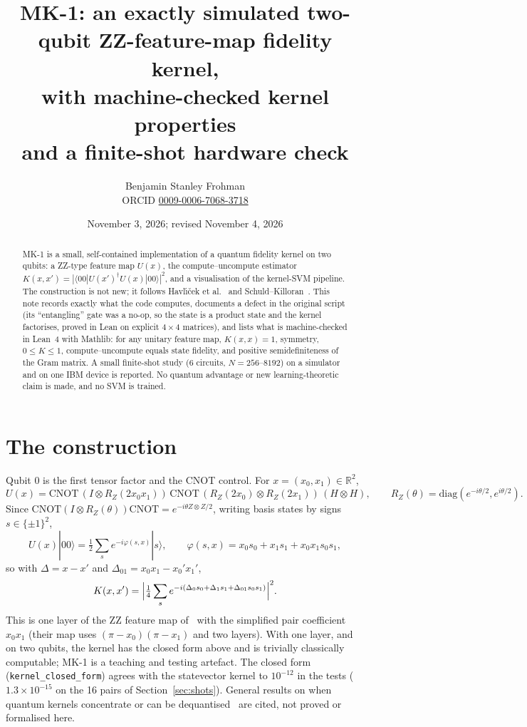 \documentclass[11pt]{article}
\title{MK-1: an exactly simulated two-qubit ZZ-feature-map fidelity kernel,\\ with machine-checked kernel properties\\ and a finite-shot hardware check}
\author{Benjamin Stanley Frohman\\ \small ORCID \href{https://orcid.org/0009-0006-7068-3718}{0009-0006-7068-3718}}
\date{November 3, 2026; revised November 4, 2026}
\begin{document}
\maketitle
{}\par

\begin{abstract}
MK-1 is a small, self-contained implementation of a quantum fidelity kernel on two qubits:
a ZZ-type feature map $U(x)$, the compute--uncompute estimator $K(x,x')=|\langle 00|U(x')^\dagger U(x)|00\rangle|^2$,
and a visualisation of the kernel-SVM pipeline. The construction is not new; it follows Havl\'{\i}\v{c}ek et al.~\cite{havlicek} and Schuld--Killoran~\cite{schuld}.
This note records exactly what the code computes, documents a defect in the original script (its ``entangling'' gate
was a no-op, so the state is a product state and the kernel factorises, proved in Lean on explicit $4\times4$ matrices), and lists what is machine-checked in Lean~4 with Mathlib: for any unitary feature map,
$K(x,x)=1$, symmetry, $0\le K\le 1$, compute--uncompute equals state fidelity, and positive semidefiniteness of the Gram matrix.
A small finite-shot study (6 circuits, $N=256$--$8192$) on a simulator and on one IBM device is reported.
No quantum advantage or new learning-theoretic claim is made, and no SVM is trained.
\end{abstract}

\section{The construction}
Qubit 0 is the first tensor factor and the CNOT control. For $x=(x_0,x_1)\in\mathbb{R}^2$,
\[
U(x)=\mathrm{CNOT}\,(I\otimes R_Z(2x_0x_1))\,\mathrm{CNOT}\,(R_Z(2x_0)\otimes R_Z(2x_1))\,(H\otimes H),
\qquad R_Z(\theta)=\mathrm{diag}(e^{-i\theta/2},e^{i\theta/2}).
\]
Since $\mathrm{CNOT}(I\otimes R_Z(\theta))\mathrm{CNOT}=e^{-i\theta Z\otimes Z/2}$, writing basis states by signs $s\in\{\pm1\}^2$,
\[
U(x)|00\rangle=\tfrac12\sum_{s} e^{-i\varphi(s,x)}|s\rangle,\qquad \varphi(s,x)=x_0s_0+x_1s_1+x_0x_1s_0s_1,
\]
so with $\Delta=x-x'$ and $\Delta_{01}=x_0x_1-x_0'x_1'$,
\[
K(x,x')=\Bigl|\tfrac14\sum_{s}e^{-i(\Delta_0s_0+\Delta_1s_1+\Delta_{01}s_0s_1)}\Bigr|^2 .
\]
This is one layer of the ZZ feature map of~\cite{havlicek} with the simplified pair coefficient $x_0x_1$
(their map uses $(\pi-x_0)(\pi-x_1)$ and two layers). With one layer, and on two qubits, the kernel has the
closed form above and is trivially classically computable; MK-1 is a teaching and testing artefact.
The closed form (\texttt{kernel\_closed\_form}) agrees with the statevector kernel to $10^{-12}$ in the tests ($1.3\times10^{-15}$ on the 16 pairs of Section~\ref{sec:shots}).
General results on when quantum kernels concentrate or can be dequantised~\cite{kubler,thanasilp,huang} are cited, not proved or formalised here.
\end{document}
